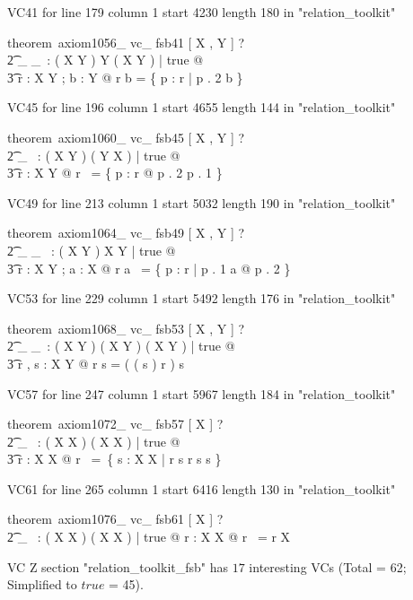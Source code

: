 \documentclass{article}
\begin{document}
VC41 for line 179 column 1 start 4230 length 180 in "relation_toolkit"
\begin{zed}
theorem~axiom1056\_ vc\_ fsb41 [ X , Y ] \vdash ? \\
   \t2 \exists \_ \nrres \_~: ( X \rel Y ) \cross \power Y \fun ( X \rel Y ) | true @ \\
    \t3 \forall r : X \rel Y ; b : \power Y @ r \nrres b = \{ p : r | p . 2 \notin b \}
\end{zed}

VC45 for line 196 column 1 start 4655 length 144 in "relation_toolkit"
\begin{zed}
theorem~axiom1060\_ vc\_ fsb45 [ X , Y ] \vdash ? \\
   \t2 \exists \_ \inv~: ( X \rel Y ) \fun ( Y \rel X ) | true @ \\
    \t3 \forall r : X \rel Y @ r \inv~= \{ p : r @ p . 2 \mapsto p . 1 \}
\end{zed}

VC49 for line 213 column 1 start 5032 length 190 in "relation_toolkit"
\begin{zed}
theorem~axiom1064\_ vc\_ fsb49 [ X , Y ] \vdash ? \\
   \t2 \exists \_ \limg \_ \rimg~: ( X \rel Y ) \cross \power X \fun \power Y | true @ \\
    \t3 \forall r : X \rel Y ; a : \power X @ r \limg a \rimg~= \{ p : r | p . 1 \in a @ p . 2 \}
\end{zed}

VC53 for line 229 column 1 start 5492 length 176 in "relation_toolkit"
\begin{zed}
theorem~axiom1068\_ vc\_ fsb53 [ X , Y ] \vdash ? \\
   \t2 \exists \_ \oplus \_~: ( X \rel Y ) \cross ( X \rel Y ) \fun ( X \rel Y ) | true @ \\
    \t3 \forall r , s : X \rel Y @ r \oplus s = ( ( \dom s ) \ndres r ) \cup s
\end{zed}

VC57 for line 247 column 1 start 5967 length 184 in "relation_toolkit"
\begin{zed}
theorem~axiom1072\_ vc\_ fsb57 [ X ] \vdash ? \\
   \t2 \exists \_ \plus~: ( X \rel X ) \fun ( X \rel X ) | true @ \\
    \t3 \forall r : X \rel X @ r \plus~=~\bigcap \{ s : X \rel X | r \subseteq s \land r \comp s \subseteq s \}
\end{zed}

VC61 for line 265 column 1 start 6416 length 130 in "relation_toolkit"
\begin{zed}
theorem~axiom1076\_ vc\_ fsb61 [ X ] \vdash ? \\
   \t2 \exists \_ \star~: ( X \rel X ) \fun ( X \rel X ) | true @ \forall r : X \rel X @ r \star~= r \plus \cup \id X
\end{zed}



 VC Z section "relation_toolkit_fsb" has $17$ interesting VCs (Total = 62; Simplified to $true$ = 45).



\end{document}
